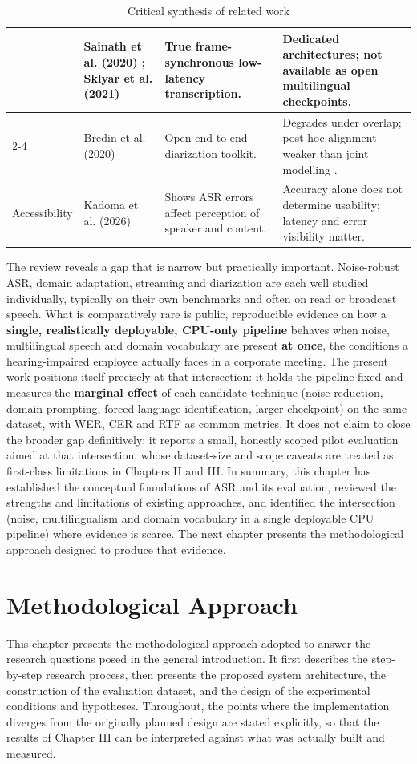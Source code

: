 \documentclass[12pt]{report}
\begin{document}
\begin{table}[htbp]
\begin{tabular}{|p{2.2cm}|p{2.8cm}|p{4.4cm}|p{4.6cm}|}
& Sainath et al. (2020) \cite{sainath2020streaming}; Sklyar et al. (2021) \cite{sklyar2021streaming}
& True frame-synchronous low-latency transcription.
& Dedicated architectures; not available as open multilingual checkpoints. \\ \cline{2-4}
& Bredin et al. (2020) \cite{bredin2020pyannote}
& Open end-to-end diarization toolkit.
& Degrades under overlap; post-hoc alignment weaker than joint modelling \cite{raj2021integration}. \\ \hline
\multirow{1}{2.2cm}{Accessibility}
& Kadoma et al. (2026) \cite{kadoma2026lost}
& Shows ASR errors affect perception of speaker and content.
& Accuracy alone does not determine usability; latency and error visibility matter. \\ \hline
\end{tabular}
\caption{Critical synthesis of related work}
\label{tab:sota_synthesis}
\end{table}
The review reveals a gap that is narrow but practically important. Noise-robust ASR, domain adaptation, streaming and diarization are each well studied individually, typically on their own benchmarks and often on read or broadcast speech. What is comparatively rare is public, reproducible evidence on how a \textbf{single, realistically deployable, CPU-only pipeline} behaves when noise, multilingual speech and domain vocabulary are present \textbf{at once}, the conditions a hearing-impaired employee actually faces in a corporate meeting. The present work positions itself precisely at that intersection: it holds the pipeline fixed and measures the \textbf{marginal effect} of each candidate technique (noise reduction, domain prompting, forced language identification, larger checkpoint) on the same dataset, with WER, CER and RTF as common metrics. It does not claim to close the broader gap definitively: it reports a small, honestly scoped pilot evaluation aimed at that intersection, whose dataset-size and scope caveats are treated as first-class limitations in Chapters II and III.
\vspace{0.5em}
In summary, this chapter has established the conceptual foundations of ASR and its evaluation, reviewed the strengths and limitations of existing approaches, and identified the intersection (noise, multilingualism and domain vocabulary in a single deployable CPU pipeline) where evidence is scarce. The next chapter presents the methodological approach designed to produce that evidence.
\chapter{Methodological Approach}
This chapter presents the methodological approach adopted to answer the research questions posed in the general introduction. It first describes the step-by-step research process, then presents the proposed system architecture, the construction of the evaluation dataset, and the design of the experimental conditions and hypotheses. Throughout, the points where the implementation diverges from the originally planned design are stated explicitly, so that the results of Chapter III can be interpreted against what was actually built and measured.
\end{document}
